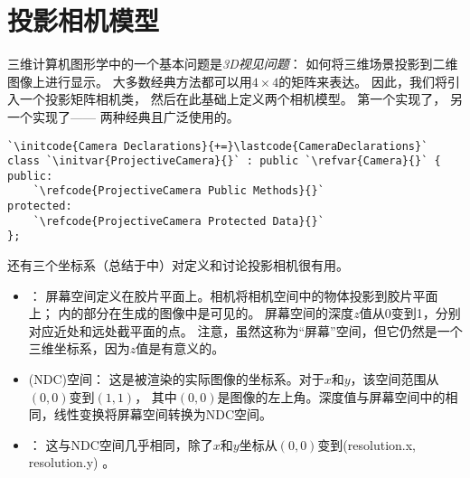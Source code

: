 \section{投影相机模型}\label{sec:投影相机模型}

三维计算机图形学中的一个基本问题是{\itshape 3D视见问题}：
如何将三维场景投影到二维图像上进行显示。
大多数经典方法都可以用$4\times4$的矩阵来表达。
因此，我们将引入一个投影矩阵相机类，
然后在此基础上定义两个相机模型。
第一个实现了，
另一个实现了——
两种经典且广泛使用的。
\begin{lstlisting}
`\initcode{Camera Declarations}{+=}\lastcode{CameraDeclarations}`
class `\initvar{ProjectiveCamera}{}` : public `\refvar{Camera}{}` {
public:
    `\refcode{ProjectiveCamera Public Methods}{}`
protected:
    `\refcode{ProjectiveCamera Protected Data}{}`
};
\end{lstlisting}

还有三个坐标系（总结于中）对定义和讨论投影相机很有用。
\begin{itemize}
    \item {}：
          屏幕空间定义在胶片平面上。相机将相机空间中的物体投影到胶片平面上；
          内的部分在生成的图像中是可见的。
          屏幕空间的深度$z$值从0变到1，分别对应近处和远处截平面的点。
          注意，虽然这称为“屏幕”空间，但它仍然是一个三维坐标系，因为$z$值是有意义的。
    \item {}(NDC){\sffamily 空间}：
          这是被渲染的实际图像的坐标系。对于$x$和$y$，该空间范围从$(0,0)$变到$(1,1)$，
          其中$(0,0)$是图像的左上角。深度值与屏幕空间中的相同，线性变换将屏幕空间转换为NDC空间。
    \item {}：
          这与NDC空间几乎相同，除了$x$和$y$坐标从$(0,0)$变到(resolution.x, resolution.y)
          。
\end{itemize}

